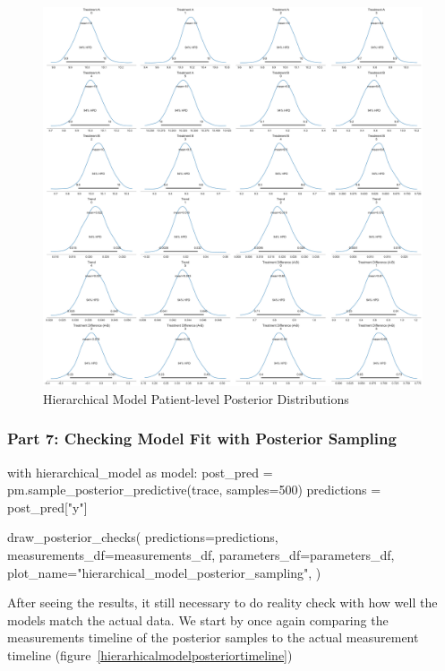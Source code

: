 \documentclass[12pt,a4paper,leqno]{report}
\theoremstyle{plain}
\theoremstyle{definition}
\theoremstyle{remark}
\begin{document}
\bigskip
\begin{figure}[H]
    \caption{Hierarchical Model Patient-level Posterior Distributions}\label{hierarchicalmodelpatientposteriors}
    \bigskip
    \includegraphics[width=\textwidth,height=\textheight,keepaspectratio]{hierarchical_model_patient_level_posteriors.pdf}
\end{figure}
\bigskip

\subsubsection*{Part 7: Checking Model Fit with Posterior Sampling}

\bigskip
\begin{pyverbatim}[][fontsize=\footnotesize]
with hierarchical_model as model:
    post_pred = pm.sample_posterior_predictive(trace, samples=500)
    predictions = post_pred["y"]

draw_posterior_checks(
    predictions=predictions,
    measurements_df=measurements_df,
    parameters_df=parameters_df,
    plot_name="hierarchical_model_posterior_sampling",
)
\end{pyverbatim}
\bigskip

After seeing the results, it still necessary to do reality check with how well the
models match the actual data. We start by once again comparing the measurements timeline
of the posterior samples to the actual measurement timeline (figure\ \ref{hierarhicalmodelposteriortimeline})
\end{document}
